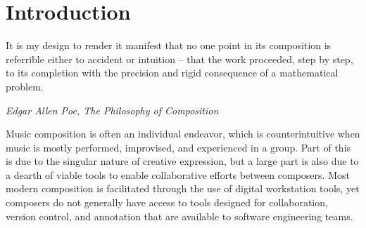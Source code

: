 \documentclass[final,authoryear,5p,times,twocolumn]{elsarticle}
\begin{document}




\section*{Introduction}
\label{sec:introduction}

\epigraph{It is my design to render it manifest that no one point in its composition is referrible either to accident or intuition -- that the work proceeded, step by step, to its completion with the precision and rigid consequence of a mathematical problem.}{\textit{Edgar Allen Poe, The Philosophy of Composition}}


Music composition is often an individual endeavor, which is counterintuitive when music is mostly performed, improvised, and experienced in a group. Part of this is due to the singular nature of creative expression, but a large part is also due to a dearth of viable tools to enable collaborative efforts between composers. Most modern composition is facilitated through the use of digital workstation tools, yet composers do not generally have access to tools designed for collaboration, version control, and annotation that are available to software engineering teams.
\end{document}
